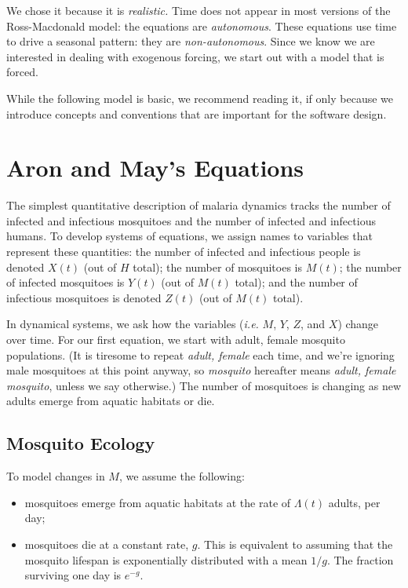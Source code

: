 \documentclass[
]{book}
\begin{document}
We chose it because it is \emph{realistic.} Time does not appear in most versions of the Ross-Macdonald model: the equations are \emph{autonomous}. These equations use time to drive a seasonal pattern: they are \emph{non-autonomous}. Since we know we are interested in dealing with exogenous forcing, we start out with a model that is forced.

While the following model is basic, we recommend reading it, if only because we introduce concepts and conventions that are important for the software design.

\hypertarget{aron-and-mays-equations}{%
\section{Aron and May's Equations}\label{aron-and-mays-equations}}

The simplest quantitative description of malaria dynamics tracks the number of infected and infectious mosquitoes and the number of infected and infectious humans. To develop systems of equations, we assign names to variables that represent these quantities: the number of infected and infectious people is denoted \(X(t)\) (out of \(H\) total); the number of mosquitoes is \(M(t)\); the number of infected mosquitoes is \(Y(t)\) (out of \(M(t)\) total); and the number of infectious mosquitoes is denoted \(Z(t)\) (out of \(M(t)\) total).

In dynamical systems, we ask how the variables (\emph{i.e.} \(M\), \(Y\), \(Z\), and \(X\)) change over time. For our first equation, we start with adult, female mosquito populations. (It is tiresome to repeat \emph{adult, female} each time, and we're ignoring male mosquitoes at this point anyway, so \emph{mosquito} hereafter means \emph{adult, female mosquito}, unless we say otherwise.) The number of mosquitoes is changing as new adults emerge from aquatic habitats or die.

\hypertarget{mosquito-ecology}{%
\subsection{Mosquito Ecology}\label{mosquito-ecology}}

To model changes in \(M\), we assume the following:

\begin{itemize}
\item
  mosquitoes emerge from aquatic habitats at the rate of \(\Lambda(t)\) adults, per day;
\item
  mosquitoes die at a constant rate, \(g\). This is equivalent to assuming that the mosquito lifespan is exponentially distributed with a mean \(1/g\). The fraction surviving one day is \(e^{-g}\).
\end{itemize}
\end{document}
